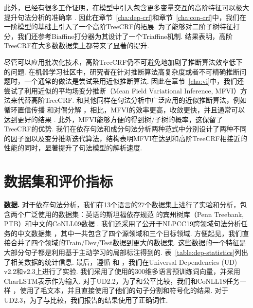 此外，已经有很多工作证明，在模型中引入包含更多变量交互的高阶特征可以极大提升句法分析的准确率 \citep{mcdonald-pereira-2006-online,chen-manning-2014-fast,ji-etal-2019-graph}.
因此在章节~\ref{cha:dep-crf}和章节~\ref{cha:con-crf}中，我们在一阶模型的基础上引入了一个高阶TreeCRF的拓展.
为了能够对二阶子树特征打分，我们还参考Biaffine打分器为其设计了一个Triaffine机制.
结果表明，高阶TreeCRF在大多数数据集上都带来了显著的提升.

尽管可以应用批次化技术，高阶TreeCRF仍不可避免地加剧了推断算法效率低下的问题.
在机器学习社区中，研究者在针对推断算法高复杂度或者不可精确推断问题时，一个通常的做法是尝试采用近似推断算法.
因此在章节~\ref{cha:vi}中，我们还尝试了利用近似的平均场变分推断（Mean Field Variational Inference, MFVI）方法来代替高阶TreeCRF.
和其他同样在句法分析中广泛应用的近似推断算法，例如循环置信传播 \citep{smith-eisner-2008-dependency}和对偶分解 \citep{martins-etal-2009-concise}，相比，MFVI的效率更高，收敛更快，并且通常可以达到更好的结果 \citep{wang-etal-2019-second}.
此外，MFVI能够方便的得到树/子树的概率，这保留了TreeCRF的优势.
我们在依存句法和成分句法分析两种范式中分别设计了两种不同的因子图以及变分推断迭代算法，结构表明MFVI在达到和高阶TreeCRF相接近的性能的同时，显著提升了句法模型的解析速度.

\section{数据集和评价指标}



\noindent\textbf{数据.}
对于依存句法分析，我们在13个语言的27个数据集上进行了实验和分析，包含两个广泛使用的数据集：英语的斯坦福依存规范 \citep{chen-manning-2014-fast}的宾州树库（Penn Treebank, PTB）和中文的CoNLL09数据 \citep{hajic-etal-2009-conll}.
我们还采用了公开于NLPCC19跨领域句法分析任务的中文数据集 \citep{peng-etal-2019-overview}，其中一共包含了四个源领域和三个目标领域.
方便起见，我们直接合并了四个领域的Train/Dev/Test数据到更大的数据集.
这些数据的一个特征是大部分句子都是利用基于主动学习的局部标注得到的.
表~\ref{table:dep-statistics}列出了相关数据的统计信息.
最后，遵循 \citet{ji-etal-2019-graph}和 \citet{zhang-etal-2019-empirical}，我们在Universal Dependencies (UD) v2.2和v2.3上进行了实验.
我们采用了\citet{zeman-etal-2018-conll}使用的300维多语言预训练词向量，并采用CharLSTM表示作为输入.
对于UD2.2，为了和\citet{ji-etal-2019-graph}公平比较，我们和CoNLL18任务一样 \citep{zeman-etal-2018-conll}，使用了毛文本，并且直接使用了他们的句子分割和符号化的结果.
对于UD2.3，为了与\citet{zhang-etal-2019-empirical}比较，我们报告的结果使用了正确词性.

